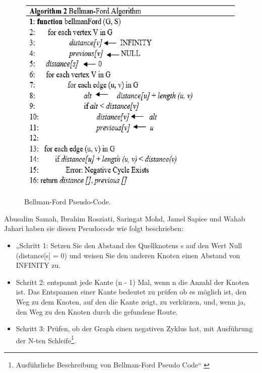  \begin{figure}[H]
	\centering
	\includegraphics[width=1.0\textwidth]{images/Bellman-Ford-Algorithmus_Pseudo-Code.PNG}
	\caption{\label{fig:Bellman}Bellman-Ford Pseudo-Code\cite{Research-id7}.}
\end{figure}
Abusalim Samah, Ibrahim Rosziati, Saringat Mohd, Jamel Sapiee und Wahab Jahari haben sie diesen Pseudocode wie folgt beschrieben:
\newline
\newline
\begin{itemize}
	\item   „Schritt 1: Setzen Sie den Abstand des Quellknotens s auf den Wert Null (distance[s] = 0) und weisen Sie den anderen Knoten einen Abstand von INFINITY zu. 
	\item Schritt 2: entspannt jede Kante (n - 1) Mal, wenn n die Anzahl der Knoten ist. Das Entspannen einer Kante bedeutet zu prüfen ob es möglich ist, den Weg zu dem Knoten, auf den die Kante zeigt, zu verkürzen, und, wenn ja, den Weg zu den Knoten durch die gefundene Route. 
	\item Schritt 3: Prüfen, ob der Graph einen negativen Zyklus hat, mit Ausführung der N-ten Schleife\footnote{Ausführliche Beschreibung von Bellman-Ford Pseudo Code“ \cite{Research-id7}}.
\end{itemize}







